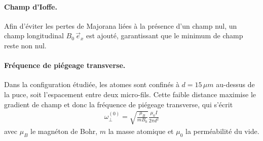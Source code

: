 
\paragraph{Champ d’Ioffe.}
Afin d’éviter les pertes de Majorana \cite{PhysRevA.74.035401} liées à la présence d’un champ nul, un champ longitudinal $B_0 \, \vec{e}_x$ est ajouté, garantissant que le minimum de champ reste non nul.%


\paragraph{Fréquence de piégeage transverse.}
Dans la configuration étudiée, les atomes sont confinés à $ d = 15\, \mu m$ au-dessus de la puce, soit l’espacement entre deux micro-fils. Cette faible distance maximise le gradient de champ et donc la fréquence de piégeage transverse, qui s’écrit
\begin{eqnarray*}
	\omega_\perp^{(0)} =  \sqrt{\frac{\mu_B}{mB_0}} \frac{\mu_0 I }{2\pi d^2} 
\end{eqnarray*}
avec $\mu_B$ le magnéton de Bohr, $m$ la masse atomique et $\mu_0$ la perméabilité du vide.

